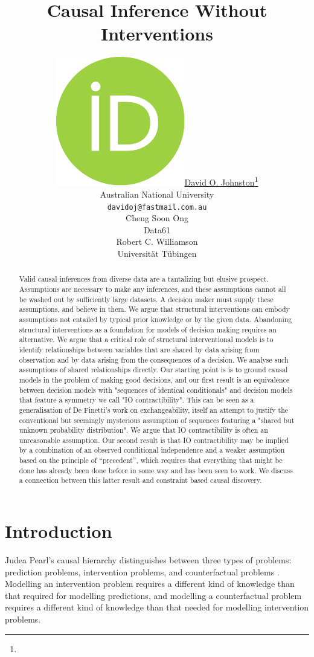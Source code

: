 \documentclass{article}
\author{ \href{https://orcid.org/0000-0003-3122-9767}{\includegraphics[scale=0.06]{orcid.pdf}\hspace{1mm}David O. Johnston}\thanks{} \\
  Australian National University \\
  \texttt{davidoj@fastmail.com.au}\\
  \And
  Cheng Soon Ong \\
  Data61\\
  \And
  Robert C. Williamson \\
  Universität Tübingen \\
}
\begin{document}
 

\title{Causal Inference Without Interventions}

\maketitle

\begin{abstract}
{Valid causal inferences from diverse data are a tantalizing but elusive prospect. Assumptions are necessary to make any inferences, and these assumptions cannot all be washed out by sufficiently large datasets. A decision maker must supply these assumptions, and believe in them. We argue that structural interventions can embody assumptions not entailed by typical prior knowledge or by the given data. Abandoning structural interventions as a foundation for models of decision making requires an alternative. We argue that a critical role of structural interventional models is to identify relationships between variables that are shared by data arising from observation and by data arising from the consequences of a decision. We analyse such assumptions of shared relationships directly. Our starting point is is to ground causal models in the problem of making good decisions, and our first result is an equivalence between decision models with "sequences of identical conditionals" and decision models that feature a symmetry we call "IO contractibility". This can be seen as a generalisation of De Finetti's work on exchangeability, itself an attempt to justify the conventional but seemingly mysterious assumption of sequences featuring a "shared but unknown probability distribution". We argue that IO contractibility is often an unreasonable assumption. Our second result is that IO contractibility may be implied by a combination of an observed conditional independence and a weaker assumption based on the principle of ``precedent'', which requires that everything that might be done has already been done before in some way and has been seen to work. We discuss a connection between this latter result and constraint based causal discovery.}
\end{abstract}


\section{Introduction}

Judea Pearl's causal hierarchy distinguishes between three types of problems: prediction problems, intervention problems, and counterfactual problems \citep{pearl_book_2018}. Modelling an intervention problem requires a different kind of knowledge than that required for modelling predictions, and modelling a counterfactual problem requires a different kind of knowledge than that needed for modelling intervention problems.
\end{document}
